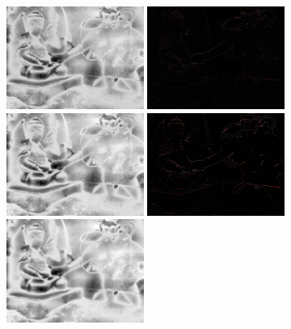 \documentclass[twoside]{article}
\begin{document}
\begin{figure}
  \centering
  \vspace{0.1cm}
  \includegraphics[width=0.4\textwidth]{Support/gaussian0.png}
  \includegraphics[width=0.4\textwidth]{Support/laplacian0.png}\\
  \vspace{0.1cm}
  \includegraphics[width=0.4\textwidth]{Support/gaussian1.png}
  \includegraphics[width=0.4\textwidth]{Support/laplacian1.png}\\
  \vspace{0.1cm}
  \includegraphics[width=0.4\textwidth]{Support/gaussian2.png}

\end{figure}
\end{document}
